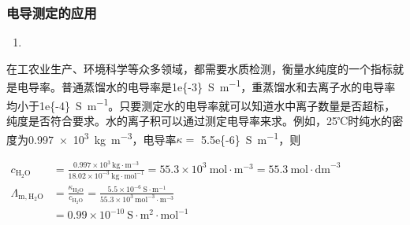 \documentclass[dvipsnames, svgnames, x11names]{beamer}
\begin{document}
	
	\begin{frame}[t]
		\frametitle{电导测定的应用}
	
		\begin{enumerate}
			\item[2.] 
		\end{enumerate}
		在工农业生产、环境科学等众多领域，都需要水质检测，衡量水纯度的一个指标就是电导率。普通蒸馏水的电导率是\SI{1e{-3}}{S.m^{-1}}，重蒸馏水和去离子水的电导率均小于\SI{1e{-4}}{S.m^{-1}}。只要测定水的电导率就可以知道水中离子数量是否超标，纯度是否符合要求。水的离子积可以通过测定电导率来求。例如，25℃时纯水的密度为\SI{0.997e3}{kg.m^{-3}}，电导率$\kappa =$ \SI{5.5e{-6}}{S.m^{-1}}，则
			
		$\begin{aligned}
			c_{\mathrm{H}_{2} \mathrm{O}}&=\frac{0.997 \times 10^{3} \mathrm{~kg} \cdot \mathrm{m}^{-3}}{18.02 \times 10^{-3} \mathrm{~kg} \cdot \mathrm{mol}^{-1}}=55.3 \times 10^{3} \mathrm{~mol} \cdot \mathrm{m}^{-3}=55.3 \mathrm{~mol} \cdot \mathrm{dm}^{-3}\\
			\Lambda_{\mathrm{m}, \mathrm{H}_{2} \mathrm{O}}&=\frac{\kappa_{\mathrm{H}_{2} \mathrm{O}}}{c_{\mathrm{H}_{2} \mathrm{O}}}=\frac{5.5 \times 10^{-6} \mathrm{~S} \cdot \mathrm{m}^{-1}}{55.3 \times 10^{3} \mathrm{~mol}^{-3} \cdot \mathrm{m}^{-3}}\\
			&=0.99 \times 10^{-10} \mathrm{~S} \cdot \mathrm{m}^{2} \cdot \mathrm{mol}^{-1}
		\end{aligned}$
		
	
	\end{frame}
	
\end{document}
